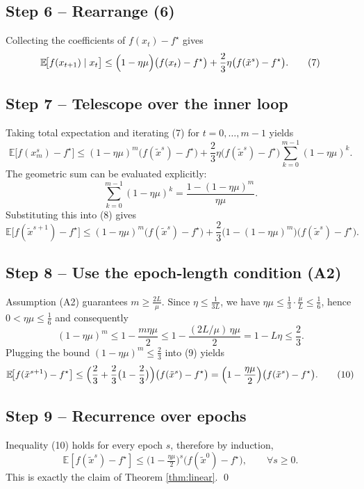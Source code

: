 \documentclass{article}
\begin{document}
\subsection*{Step 6 – Rearrange (6)}
Collecting the coefficients of $f(x_t)-f^{\star}$ gives
\[
\mathbb{E}\!\bigl[f(x_{t+1})\mid x_t\bigr]
\le \Bigl(1-\eta\mu\Bigr)\bigl(f(x_t)-f^{\star}\bigr)
     +\frac{2}{3}\eta\bigl(f(\tilde{x}^{s})-f^{\star}\bigr). \tag{7}
\]

\subsection*{Step 7 – Telescope over the inner loop}
Taking total expectation and iterating (7) for $t=0,\dots,m-1$ yields
\[
\mathbb{E}\!\bigl[f(x_{m}^{s})-f^{\star}\bigr]
\le (1-\eta\mu)^{m}\bigl(f(\tilde{x}^{s})-f^{\star}\bigr)
   +\frac{2}{3}\eta\bigl(f(\tilde{x}^{s})-f^{\star}\bigr)
     \sum_{k=0}^{m-1}(1-\eta\mu)^{k}. \tag{8}
\]
The geometric sum can be evaluated explicitly:
\[
\sum_{k=0}^{m-1}(1-\eta\mu)^{k}
= \frac{1-(1-\eta\mu)^{m}}{\eta\mu}.
\]
Substituting this into (8) gives
\[
\mathbb{E}\!\bigl[f(\tilde{x}^{s+1})-f^{\star}\bigr]
\le (1-\eta\mu)^{m}\bigl(f(\tilde{x}^{s})-f^{\star}\bigr)
   +\frac{2}{3}\bigl(1-(1-\eta\mu)^{m}\bigr)\bigl(f(\tilde{x}^{s})-f^{\star}\bigr). \tag{9}
\]

\subsection*{Step 8 – Use the epoch‑length condition (A2)}
Assumption (A2) guarantees $m\ge\frac{2L}{\mu}$.  
Since $\eta\le\frac{1}{3L}$, we have $\eta\mu\le\frac{1}{3}\cdot\frac{\mu}{L}\le\frac{1}{6}$,
hence $0<\eta\mu\le\frac{1}{6}$ and consequently
\[
(1-\eta\mu)^{m}\le 1-\frac{m\eta\mu}{2}
\le 1-\frac{(2L/\mu)\,\eta\mu}{2}=1-L\eta\le\frac{2}{3}.
\]
Plugging the bound $(1-\eta\mu)^{m}\le\frac{2}{3}$ into (9) yields
\[
\mathbb{E}\!\bigl[f(\tilde{x}^{s+1})-f^{\star}\bigr]
\le\Bigl(\frac{2}{3}+\frac{2}{3}\bigl(1-\frac{2}{3}\bigr)\Bigr)
      \bigl(f(\tilde{x}^{s})-f^{\star}\bigr)
= \Bigl(1-\frac{\eta\mu}{2}\Bigr)\bigl(f(\tilde{x}^{s})-f^{\star}\bigr). \tag{10}
\]

\subsection*{Step 9 – Recurrence over epochs}
Inequality (10) holds for every epoch $s$, therefore by induction,
\[
\mathbb{E}[f(\tilde{x}^{s})-f^{\star}]
\le \bigl(1-\tfrac{\eta\mu}{2}\bigr)^{s}\bigl(f(\tilde{x}^{0})-f^{\star}\bigr),
\qquad\forall s\ge0 .
\]
This is exactly the claim of Theorem \ref{thm:linear}. \hfill\qed
\end{document}
